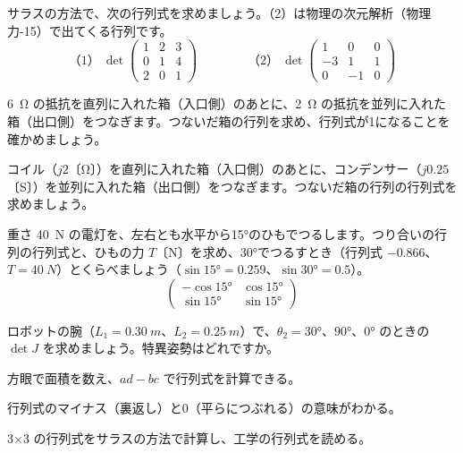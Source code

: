 \bkproblem サラスの方法で、次の行列式を求めましょう。（2）は物理の次元解析（物理 力-15）で出てくる行列です。
\[ \text{（1）}\ \det\begin{pmatrix}1&2&3\\0&1&4\\2&0&1\end{pmatrix}\qquad\qquad \text{（2）}\ \det\begin{pmatrix}1&0&0\\-3&1&1\\0&-1&0\end{pmatrix} \]

\bkproblem \qty{6}{\ohm} の抵抗を直列に入れた箱（入口側）のあとに、\qty{2}{\ohm} の抵抗を並列に入れた箱（出口側）をつなぎます。つないだ箱の行列を求め、行列式が1になることを確かめましょう。

\bkproblem コイル（$j2$〔Ω〕）を直列に入れた箱（入口側）のあとに、コンデンサー（$j0.25$〔S〕）を並列に入れた箱（出口側）をつなぎます。つないだ箱の行列の行列式を求めましょう。


\bkproblem 重さ \qty{40}{N} の電灯を、左右とも水平から15°のひもでつるします。つり合いの行列の行列式と、ひもの力 $T$〔N〕を求め、30°でつるすとき（行列式 $-0.866$、$T=\qty{40}{N}$）とくらべましょう（$\sin15°=0.259$、$\sin30°=0.5$）。
\[ \begin{pmatrix}-\cos15°&\cos15°\\ \sin15°&\sin15°\end{pmatrix} \]

\bkproblem ロボットの腕（$L_1=\qty{0.30}{m}$、$L_2=\qty{0.25}{m}$）で、$\theta_2=30°$、$90°$、$0°$ のときの $\det J$ を求めましょう。特異姿勢はどれですか。


\begin{furikaeri}
\begin{checklist}
\item 方眼で面積を数え、$ad-bc$ で行列式を計算できる。
\item 行列式のマイナス（裏返し）と0（平らにつぶれる）の意味がわかる。
\item 3×3 の行列式をサラスの方法で計算し、工学の行列式を読める。
\end{checklist}
\end{furikaeri}


